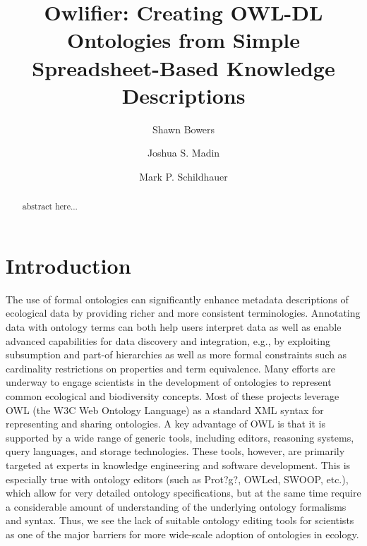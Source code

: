 \documentclass[preprint,number]{elsarticle}
\title{Owlifier: Creating OWL-DL Ontologies from Simple
  Spreadsheet-Based Knowledge Descriptions\tnoteref{t1}}
\author[smb]{Shawn Bowers\corref{cor1}}
\author[jsm]{Joshua S. Madin}
\author[mps]{Mark P. Schildhauer}
\begin{document}
\begin{abstract}
abstract here...
\end{abstract}

\maketitle




\section{Introduction}


The use of formal ontologies can significantly enhance metadata
descriptions of ecological data by providing richer and more
consistent terminologies. Annotating data with ontology terms can both
help users interpret data as well as enable advanced capabilities for
data discovery and integration, e.g., by exploiting subsumption and
part-of hierarchies as well as more formal constraints such as
cardinality restrictions on properties and term equivalence. Many
efforts are underway to engage scientists in the development of
ontologies to represent common ecological and biodiversity
concepts. Most of these projects leverage OWL (the W3C Web Ontology
Language) as a standard XML syntax for representing and sharing
ontologies. A key advantage of OWL is that it is supported by a wide
range of generic tools, including editors, reasoning systems, query
languages, and storage technologies. These tools, however, are
primarily targeted at experts in knowledge engineering and software
development. This is especially true with ontology editors (such as
Prot?g?, OWLed, SWOOP, etc.), which allow for very detailed ontology
specifications, but at the same time require a considerable amount of
understanding of the underlying ontology formalisms and syntax. Thus,
we see the lack of suitable ontology editing tools for scientists as
one of the major barriers for more wide-scale adoption of ontologies
in ecology.
\end{document}
